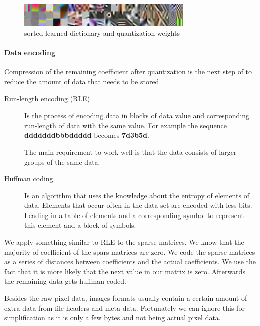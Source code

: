 \begin{figure}[h]
\centering
\includegraphics[width = 0.75\textwidth]{images/sorted.png}
\caption{sorted learned dictionary and quantization weights}
\label{fig:sorted}
\end{figure}

\paragraph{Data encoding}
Compression of the remaining coefficient after quantization is the next step
of to reduce the amount of data that needs to be stored.
\begin{description}
 \item[Run-length encoding (RLE)] Is the process of encoding data in blocks of
data value and corresponding run-length of data with the same value. 
For example the sequence {\bf dddddddbbbddddd} becomes {\bf7d3b5d}.

The main requirement to work well is that the data consists of larger groups of
the same
data.
  \item[Huffman coding] Is an algorithm that uses the knowledge about the
entropy of elements of data. Elements that occur often in the data set are
encoded with less bits. Leading in a table of elements and a corresponding
symbol to represent this element and a block of symbols.
\end{description}

We apply something similar to RLE to the sparse matrices. We know that the
majority of coefficient of the spars matrices are zero. We code the sparse
matrices as a series of distances between coefficients and the actual
coefficients. We use the fact that it is more likely that the next value in our
matrix is zero. Afterwards the remaining data gets huffman coded.

Besides the raw pixel data, images formats usually contain a certain amount
of extra data from file headers and meta data. Fortunately we can ignore this
for simplification as it is only a few bytes and not being actual pixel data.


